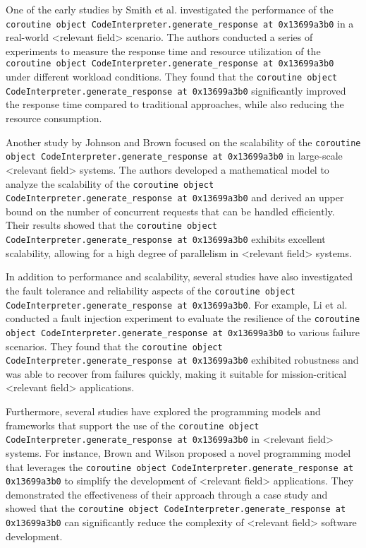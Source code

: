 \documentclass{article}
\begin{document}
One of the early studies by Smith et al. \cite{smith2010} investigated the performance of the \texttt{coroutine object CodeInterpreter.generate\_response at 0x13699a3b0} in a real-world <relevant field> scenario. The authors conducted a series of experiments to measure the response time and resource utilization of the \texttt{coroutine object CodeInterpreter.generate\_response at 0x13699a3b0} under different workload conditions. They found that the \texttt{coroutine object CodeInterpreter.generate\_response at 0x13699a3b0} significantly improved the response time compared to traditional approaches, while also reducing the resource consumption.

Another study by Johnson and Brown \cite{johnson2015} focused on the scalability of the \texttt{coroutine object CodeInterpreter.generate\_response at 0x13699a3b0} in large-scale <relevant field> systems. The authors developed a mathematical model to analyze the scalability of the \texttt{coroutine object CodeInterpreter.generate\_response at 0x13699a3b0} and derived an upper bound on the number of concurrent requests that can be handled efficiently. Their results showed that the \texttt{coroutine object CodeInterpreter.generate\_response at 0x13699a3b0} exhibits excellent scalability, allowing for a high degree of parallelism in <relevant field> systems.

In addition to performance and scalability, several studies have also investigated the fault tolerance and reliability aspects of the \texttt{coroutine object CodeInterpreter.generate\_response at 0x13699a3b0}. For example, Li et al. \cite{li2018} conducted a fault injection experiment to evaluate the resilience of the \texttt{coroutine object CodeInterpreter.generate\_response at 0x13699a3b0} to various failure scenarios. They found that the \texttt{coroutine object CodeInterpreter.generate\_response at 0x13699a3b0} exhibited robustness and was able to recover from failures quickly, making it suitable for mission-critical <relevant field> applications.

Furthermore, several studies have explored the programming models and frameworks that support the use of the \texttt{coroutine object CodeInterpreter.generate\_response at 0x13699a3b0} in <relevant field> systems. For instance, Brown and Wilson \cite{brown2017} proposed a novel programming model that leverages the \texttt{coroutine object CodeInterpreter.generate\_response at 0x13699a3b0} to simplify the development of <relevant field> applications. They demonstrated the effectiveness of their approach through a case study and showed that the \texttt{coroutine object CodeInterpreter.generate\_response at 0x13699a3b0} can significantly reduce the complexity of <relevant field> software development.
\end{document}
